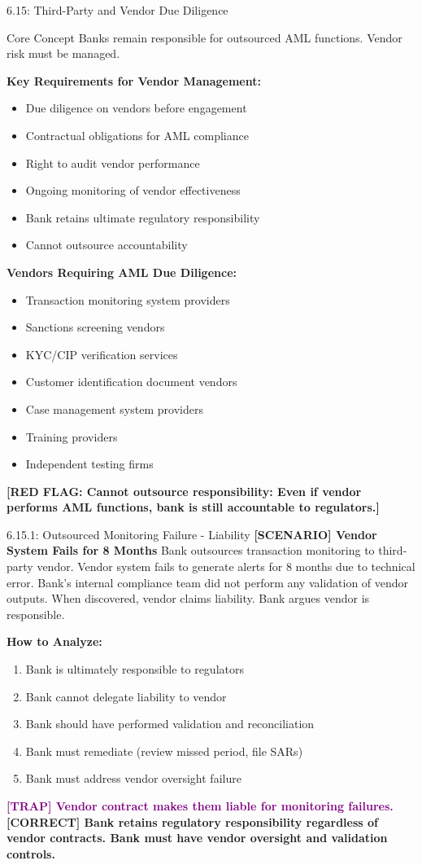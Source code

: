 \documentclass[11pt,a4paper]{beamer}
\newcommand{\trap}[1]{\textcolor{purple}{\textbf{[TRAP] #1}}}
\newcommand{\correct}[1]{\textcolor{green!50!black}{\textbf{[CORRECT] #1}}}
\newcommand{\scenario}[1]{\textcolor{blue!70!black}{\textbf{[SCENARIO] #1}}}
\newcommand{\redflag}[1]{\textcolor{red!80!black}{\textbf{[RED FLAG: #1]}}}
\begin{document}
\begin{frame}{6.15: Third-Party and Vendor Due Diligence}
	\begin{block}{Core Concept}
		Banks remain responsible for outsourced AML functions. Vendor risk must be managed.
	\end{block}
	\textbf{Key Requirements for Vendor Management:}
	\begin{itemize}
		\item Due diligence on vendors before engagement
		\item Contractual obligations for AML compliance
		\item Right to audit vendor performance
		\item Ongoing monitoring of vendor effectiveness
		\item Bank retains ultimate regulatory responsibility
		\item Cannot outsource accountability
	\end{itemize}
	\textbf{Vendors Requiring AML Due Diligence:}
	\begin{itemize}
		\item Transaction monitoring system providers
		\item Sanctions screening vendors
		\item KYC/CIP verification services
		\item Customer identification document vendors
		\item Case management system providers
		\item Training providers
		\item Independent testing firms
	\end{itemize}
	\redflag{Cannot outsource responsibility: Even if vendor performs AML functions, bank is still accountable to regulators.}
\end{frame}

\begin{frame}{6.15.1: Outsourced Monitoring Failure - Liability}
	\scenario{Vendor System Fails for 8 Months}
	Bank outsources transaction monitoring to third-party vendor. Vendor system fails to generate alerts for 8 months due to technical error. Bank's internal compliance team did not perform any validation of vendor outputs. When discovered, vendor claims liability. Bank argues vendor is responsible.
	
	\vspace{0.1cm}
	\textbf{How to Analyze:}
	\begin{enumerate}
		\item Bank is ultimately responsible to regulators
		\item Bank cannot delegate liability to vendor
		\item Bank should have performed validation and reconciliation
		\item Bank must remediate (review missed period, file SARs)
		\item Bank must address vendor oversight failure
	\end{enumerate}
	\trap{Vendor contract makes them liable for monitoring failures.}
	\correct{Bank retains regulatory responsibility regardless of vendor contracts. Bank must have vendor oversight and validation controls.}
\end{frame}
\end{document}
